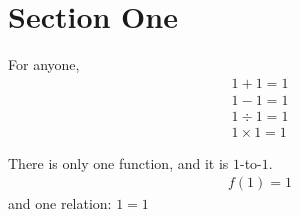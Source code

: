 \setcounter{section}{0}

\section{Section One}
\begin{defn}
  For anyone,
  \begin{align*}
    1+1=1\\
    1-1=1\\
    1 \div 1=1\\
    1\times 1=1
  \end{align*}
\end{defn}
There is only one function, and it is $1$-to-$1$.
\begin{align*}
  f(1) = 1
\end{align*}
and one relation: $1=1$

